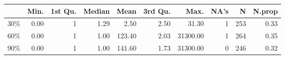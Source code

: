 \begin{table}[ht]
\centering
\begin{tabular}{lrrrrrrrrr}
  \hline
 & Min. & 1st Qu. & Median & Mean & 3rd Qu. & Max. & NA's & N & N.prop \\ 
  \hline
30\% & 0.00 &   1 & 1.29 & 2.50 & 2.50 & 31.30 &   1 & 253 & 0.33 \\ 
  60\% & 0.00 &   1 & 1.00 & 123.40 & 2.03 & 31300.00 &   1 & 264 & 0.35 \\ 
  90\% & 0.00 &   1 & 1.00 & 141.60 & 1.73 & 31300.00 &   0 & 246 & 0.32 \\ 
   \hline
\end{tabular}
\end{table}
